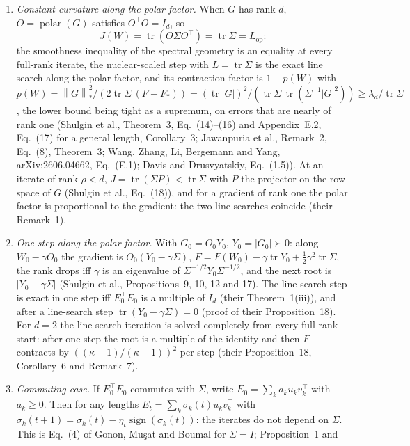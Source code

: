 \documentclass[11pt]{article}
\theoremstyle{definition}
\theoremstyle{remark}
\newcommand{\nnuc}[1]{\left\|#1\right\|_{*}}
\newcommand{\abs}[1]{\left|#1\right|}
\newcommand{\tr}{\operatorname{tr}}
\newcommand{\polar}{\operatorname{polar}}
\newcommand{\sign}{\operatorname{sign}}
\newcommand{\Lop}{L_{\mathrm{op}}}
\begin{document}
\begin{enumerate}[label=(K\arabic*)]
\item \emph{Constant curvature along the polar factor.} When $G$ has rank $d$, $O=\polar(G)$ satisfies $O^\top O=I_d$, so
\begin{equation}\label{eq:Jconst}
J(W)=\tr(O\Sigma O^\top)=\tr\Sigma=\Lop :
\end{equation}
the smoothness inequality of the spectral geometry is an equality at every full-rank iterate, the nuclear-scaled step
with $L=\tr\Sigma$ is the exact line search along the polar factor, and its contraction factor is $1-p(W)$ with
$p(W)=\nnuc G^2/(2\tr\Sigma\,(F-F_\ast))=(\tr\abs G)^2/(\tr\Sigma\,\tr(\Sigma^{-1}\abs G^2))\ge\lambda_d/\tr\Sigma$, the lower
bound being tight as a supremum, on errors that are nearly of rank one (Shulgin et al., Theorem~3, Eq.~(14)--(16) and
Appendix~E.2, Eq.~(17) for a general length, Corollary~3; Jawanpuria et al., Remark~2, Eq.~(8), Theorem~3; Wang, Zhang,
Li, Bergemann and Yang, arXiv:2606.04662, Eq.~(E.1); Davis and Drusvyatskiy, Eq.~(1.5)). At an iterate of rank $\rho<d$,
$J=\tr(\Sigma P)<\tr\Sigma$ with $P$ the projector on the row space of $G$ (Shulgin et al., Eq.~(18)), and for a
gradient of rank one the polar factor is proportional to the gradient: the two line searches coincide (their Remark~1).
\item \emph{One step along the polar factor.} With $G_0=O_0Y_0$, $Y_0=\abs{G_0}\succ0$: along $W_0-\gamma O_0$ the gradient
is $O_0(Y_0-\gamma\Sigma)$, $F=F(W_0)-\gamma\tr Y_0+\frac12\gamma^2\tr\Sigma$, the rank drops iff $\gamma$ is an eigenvalue of
$\Sigma^{-1/2}Y_0\Sigma^{-1/2}$, and the next root is $\abs{Y_0-\gamma\Sigma}$ (Shulgin et al., Propositions~9, 10, 12
and 17). The line-search step is exact in one step iff $E_0^\top E_0$ is a multiple of $I_d$ (their Theorem~1(iii)), and
after a line-search step $\tr(Y_0-\gamma\Sigma)=0$ (proof of their Proposition~18). For $d=2$ the line-search iteration
is solved completely from every full-rank start: after one step the root is a multiple of the identity and then $F$
contracts by $((\kappa-1)/(\kappa+1))^2$ per step (their Proposition~18, Corollary~6 and Remark~7).
\item \emph{Commuting case.} If $E_0^\top E_0$ commutes with $\Sigma$, write $E_0=\sum_ka_ku_kv_k^\top$ with $a_k\ge0$.
Then for any lengths $E_t=\sum_k\sigma_k(t)u_kv_k^\top$ with $\sigma_k(t+1)=\sigma_k(t)-\eta_t\sign(\sigma_k(t))$: the
iterates do not depend on $\Sigma$. This is Eq.~(4) of Gonon, Mu\c{s}at and Boumal for $\Sigma=I$; Proposition~1 and

\end{enumerate}
\end{document}
